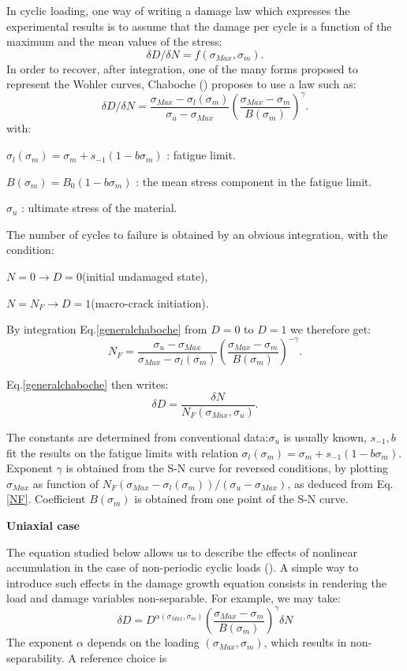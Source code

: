 In cyclic loading, one way of writing a damage law which expresses the experimental results is to assume that the damage per cycle is a function of the maximum and the mean values of the stress:
$$\delta D/\delta N=f(\sigma_{Max},\sigma_m).$$
In order to recover, after integration, one of the many forms proposed to represent the Wohler curves, Chaboche (\cite{FFE:FFE1}) proposes to use a law such as:
\begin{equation}
\delta D/\delta N=\frac{\sigma_{Max}-\sigma_l(\sigma_m)}{\sigma_{u}-\sigma_{Max}}\left( \frac{\sigma_{Max}-\sigma_m}{B(\sigma_m)}\right) ^{\gamma}.
\label{generalchaboche}
\end{equation}
with:

$\sigma_l(\sigma_m)=\sigma_m+s_{-1}(1-b\sigma_m)$ :  fatigue limit.

$B(\sigma_m)=B_0(1-b\sigma_m)$ : the mean stress component in the fatigue limit.

$\sigma_u$ : ultimate stress of the material.

The number of cycles to failure is obtained by an obvious integration, with the condition:

$N=0 \to D=0$(initial undamaged state),

$N=N_F \to D=1$(macro-crack initiation).

By integration Eq.\eqref{generalchaboche} from $D=0$ to $D=1$ we therefore get:
\begin{equation}N_F=\frac{\sigma_{u}-\sigma_{Max}}{\sigma_{Max}-\sigma_l(\sigma_m)}\left(\frac{\sigma_{Max}-\sigma_m}{B(\sigma_m)}\right)^{-\gamma}.
\label{NF}
\end{equation}

Eq.\eqref{generalchaboche} then writes:
$$\delta D=\dfrac{\delta N}{N_F(\sigma_{Max},\sigma_{u})}.$$

The constants are determined from conventional data:$\sigma_u$ is usually known, $s_{-1},b$ fit the results on the fatigue limits with relation $\sigma_l(\sigma_m)=\sigma_m+s_{-1}(1-b\sigma_m)$. Exponent $\gamma$ is obtained from the S-N curve for reversed conditions, by plotting $\sigma_{Max}$ as function of $N_F(\sigma_{Max}-\sigma_l(\sigma_m))/(\sigma_{u}-\sigma_{Max})$, as deduced from Eq.\eqref{NF}. Coefficient $B(\sigma_m)$ is obtained from one point of the S-N curve.

\vspace{6pt}
\textbf{Uniaxial case}
\vspace{6pt}

The equation studied below allows us to describe the effects of nonlinear accumulation in the case of non-periodic cyclic loads (\cite{FFE:FFE1}). A simple way to introduce such effects in the damage growth equation consists in rendering the load and damage variables non-separable. For example, we may take:
$$\delta D=D^{\alpha(\sigma_{Max},\sigma_m)}\left(\frac{\sigma_{Max}-\sigma_m}{B(\sigma_m)}\right)^\gamma\delta N$$
The exponent $\alpha$ depends on the loading $(\sigma_{Max},\sigma_m)$, which results in non-separability. A reference choice is

